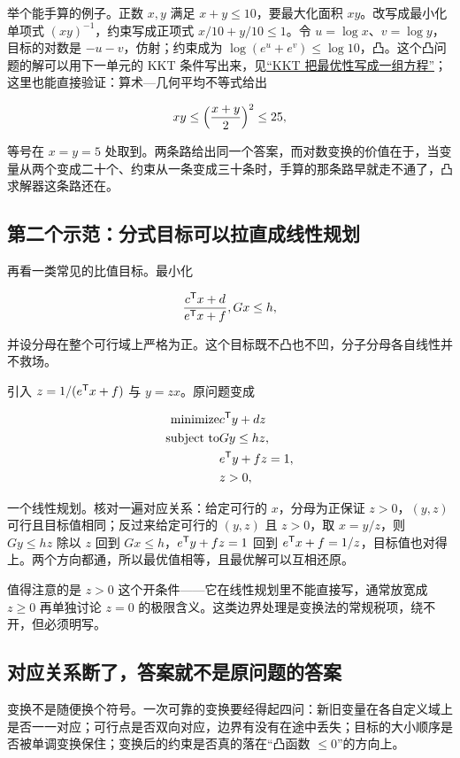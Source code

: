 举个能手算的例子。正数 \(x,y\) 满足 \(x+y\le10\)，要最大化面积 \(xy\)。改写成最小化单项式 \((xy)^{-1}\)，约束写成正项式 \(x/10+y/10\le1\)。令 \(u=\log x\)、\(v=\log y\)，目标的对数是 \(-u-v\)，仿射；约束成为 \(\log(e^u+e^v)\le\log10\)，凸。这个凸问题的解可以用下一单元的 KKT 条件写出来，见\hyperref[sec:09-Convex-Optimization/05-Duality/03]{``KKT 把最优性写成一组方程''}；这里也能直接验证：算术---几何平均不等式给出

\[
xy\le\Bigl(\frac{x+y}{2}\Bigr)^2\le25,
\]

等号在 \(x=y=5\) 处取到。两条路给出同一个答案，而对数变换的价值在于，当变量从两个变成二十个、约束从一条变成三十条时，手算的那条路早就走不通了，凸求解器这条路还在。

\subsection{第二个示范：分式目标可以拉直成线性规划}

再看一类常见的比值目标。最小化

\[
\frac{c^{\mathsf{T}}x+d}{e^{\mathsf{T}}x+f},\space Gx\le h,
\]

并设分母在整个可行域上严格为正。这个目标既不凸也不凹，分子分母各自线性并不救场。

引入 \(z=1/(e^{\mathsf{T}}x+f)\) 与 \(y=zx\)。原问题变成

\[
\begin{aligned}
\text{minimize}\space&c^{\mathsf{T}}y+dz\\
\text{subject to}\space&Gy\le hz,\\
&e^{\mathsf{T}}y+fz=1,\\
&z>0,
\end{aligned}
\]

一个线性规划。核对一遍对应关系：给定可行的 \(x\)，分母为正保证 \(z>0\)，\((y,z)\) 可行且目标值相同；反过来给定可行的 \((y,z)\) 且 \(z>0\)，取 \(x=y/z\)，则 \(Gy\le hz\) 除以 \(z\) 回到 \(Gx\le h\)，\(e^{\mathsf{T}}y+fz=1\) 回到 \(e^{\mathsf{T}}x+f=1/z\)，目标值也对得上。两个方向都通，所以最优值相等，且最优解可以互相还原。

值得注意的是 \(z>0\) 这个开条件——它在线性规划里不能直接写，通常放宽成 \(z\ge0\) 再单独讨论 \(z=0\) 的极限含义。这类边界处理是变换法的常规税项，绕不开，但必须明写。

\subsection{对应关系断了，答案就不是原问题的答案}

变换不是随便换个符号。一次可靠的变换要经得起四问：新旧变量在各自定义域上是否一一对应；可行点是否双向对应，边界有没有在途中丢失；目标的大小顺序是否被单调变换保住；变换后的约束是否真的落在``凸函数 \(\le0\)''的方向上。


